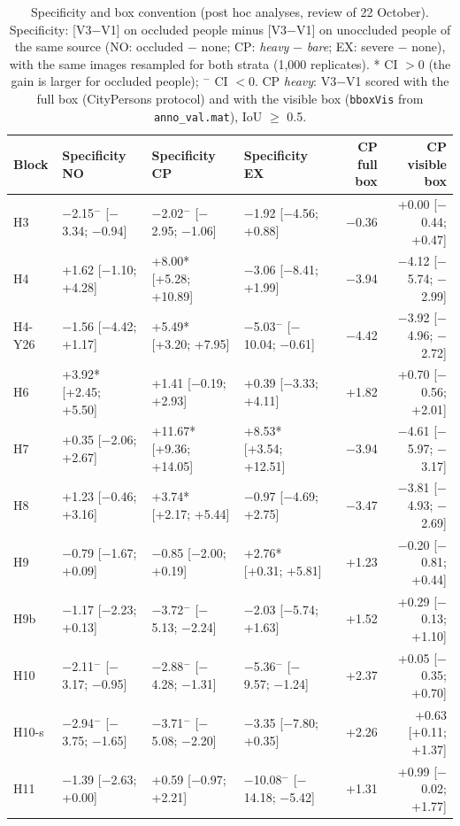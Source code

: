 \begin{table}[H]\centering\scriptsize
\caption{Specificity and box convention (post hoc analyses, review of 22 October). Specificity: [V3$-$V1] on occluded people minus [V3$-$V1] on unoccluded people of the same source (NO: occluded $-$ none; CP: \emph{heavy} $-$ \emph{bare}; EX: severe $-$ none), with the same images resampled for both strata (1,000 replicates). * CI $>0$ (the gain is larger for occluded people); $^-$ CI $<0$. CP \emph{heavy}: V3$-$V1 scored with the full box (CityPersons protocol) and with the visible box (\texttt{bboxVis} from \texttt{anno\_val.mat}), IoU $\geq$ 0.5.}\label{tab:s-especificidad}
\setlength{\tabcolsep}{3pt}\begin{tabular}{@{}l lll rr@{}}\toprule
Block & Specificity NO & Specificity CP & Specificity EX & CP full box & CP visible box \\
\midrule
H3 & $-$2.15$^-$ [$-$3.34; $-$0.94] & $-$2.02$^-$ [$-$2.95; $-$1.06] & $-$1.92 [$-$4.56; +0.88] & $-$0.36 & +0.00 [$-$0.44; +0.47] \\
H4 & +1.62 [$-$1.10; +4.28] & +8.00* [+5.28; +10.89] & $-$3.06 [$-$8.41; +1.99] & $-$3.94 & $-$4.12 [$-$5.74; $-$2.99] \\
H4-Y26 & $-$1.56 [$-$4.42; +1.17] & +5.49* [+3.20; +7.95] & $-$5.03$^-$ [$-$10.04; $-$0.61] & $-$4.42 & $-$3.92 [$-$4.96; $-$2.72] \\
H6 & +3.92* [+2.45; +5.50] & +1.41 [$-$0.19; +2.93] & +0.39 [$-$3.33; +4.11] & +1.82 & +0.70 [$-$0.56; +2.01] \\
H7 & +0.35 [$-$2.06; +2.67] & +11.67* [+9.36; +14.05] & +8.53* [+3.54; +12.51] & $-$3.94 & $-$4.61 [$-$5.97; $-$3.17] \\
H8 & +1.23 [$-$0.46; +3.16] & +3.74* [+2.17; +5.44] & $-$0.97 [$-$4.69; +2.75] & $-$3.47 & $-$3.81 [$-$4.93; $-$2.69] \\
H9 & $-$0.79 [$-$1.67; +0.09] & $-$0.85 [$-$2.00; +0.19] & +2.76* [+0.31; +5.81] & +1.23 & $-$0.20 [$-$0.81; +0.44] \\
H9b & $-$1.17 [$-$2.23; +0.13] & $-$3.72$^-$ [$-$5.13; $-$2.24] & $-$2.03 [$-$5.74; +1.63] & +1.52 & +0.29 [$-$0.13; +1.10] \\
H10 & $-$2.11$^-$ [$-$3.17; $-$0.95] & $-$2.88$^-$ [$-$4.28; $-$1.31] & $-$5.36$^-$ [$-$9.57; $-$1.24] & +2.37 & +0.05 [$-$0.35; +0.70] \\
H10-s & $-$2.94$^-$ [$-$3.75; $-$1.65] & $-$3.71$^-$ [$-$5.08; $-$2.20] & $-$3.35 [$-$7.80; +0.35] & +2.26 & +0.63 [+0.11; +1.37] \\
H11 & $-$1.39 [$-$2.63; +0.00] & +0.59 [$-$0.97; +2.21] & $-$10.08$^-$ [$-$14.18; $-$5.42] & +1.31 & +0.99 [$-$0.02; +1.77] \\

\end{tabular}
\end{table}
